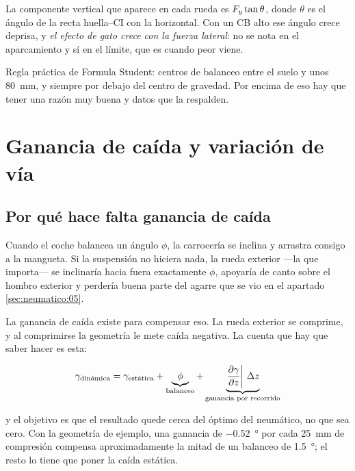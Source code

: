 \begin{clave}
La componente vertical que aparece en cada rueda es
$F_y \tan\theta$, donde $\theta$ es el ángulo de la recta huella--CI con la
horizontal. Con un CB alto ese ángulo crece deprisa, y \emph{el efecto de gato
crece con la fuerza lateral}: no se nota en el aparcamiento y sí en el límite,
que es cuando peor viene.

Regla práctica de Formula Student: centros de balanceo entre el suelo y unos
\SI{80}{\milli\meter}, y siempre por debajo del centro de gravedad. Por encima
de eso hay que tener una razón muy buena y datos que la respalden.
\end{clave}

\section{Ganancia de caída y variación de vía}
\label{sec:cinematica_suspension:02}

\subsection{Por qué hace falta ganancia de caída}

Cuando el coche balancea un ángulo $\phi$, la carrocería se inclina y arrastra
consigo a la mangueta. Si la suspensión no hiciera nada, la rueda exterior
---la que importa--- se inclinaría hacia fuera exactamente $\phi$, apoyaría de
canto sobre el hombro exterior y perdería buena parte del agarre que se vio en
el apartado \ref{sec:neumatico:05}.

La ganancia de caída existe para compensar eso. La rueda exterior se comprime,
y al comprimirse la geometría le mete caída negativa. La cuenta que hay que
saber hacer es esta:

\begin{equation}
  \gamma_{\text{dinámica}} = \gamma_{\text{estática}}
     + \underbrace{\phi}_{\text{balanceo}}
     + \underbrace{\left.\frac{\partial \gamma}{\partial z}\right|\,\Delta z}
       _{\text{ganancia por recorrido}}
  \label{eq:caida_dinamica}
\end{equation}

y el objetivo es que el resultado quede cerca del óptimo del neumático, no que
sea cero. Con la geometría de ejemplo, una ganancia de
\SI{-0.52}{\degree} por cada \SI{25}{\milli\meter} de compresión compensa
aproximadamente la mitad de un balanceo de \SI{1.5}{\degree}; el resto lo tiene
que poner la caída estática.

